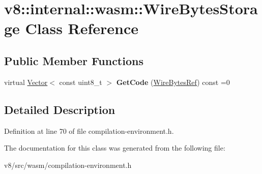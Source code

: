\hypertarget{classv8_1_1internal_1_1wasm_1_1WireBytesStorage}{}\section{v8\+:\+:internal\+:\+:wasm\+:\+:Wire\+Bytes\+Storage Class Reference}
\label{classv8_1_1internal_1_1wasm_1_1WireBytesStorage}
\subsection*{Public Member Functions}
\begin{DoxyCompactItemize}
\item 
\mbox{\label{classv8_1_1internal_1_1wasm_1_1WireBytesStorage_a022c4a1cddfe97cfeaa966bb93f26a53}} 
virtual \mbox{\hyperlink{classv8_1_1internal_1_1Vector}{Vector}}$<$ const uint8\+\_\+t $>$ {\bfseries Get\+Code} (\mbox{\hyperlink{classv8_1_1internal_1_1wasm_1_1WireBytesRef}{Wire\+Bytes\+Ref}}) const =0
\end{DoxyCompactItemize}


\subsection{Detailed Description}


Definition at line 70 of file compilation-\/environment.\+h.



The documentation for this class was generated from the following file\+:\begin{DoxyCompactItemize}
\item 
v8/src/wasm/compilation-\/environment.\+h\end{DoxyCompactItemize}

